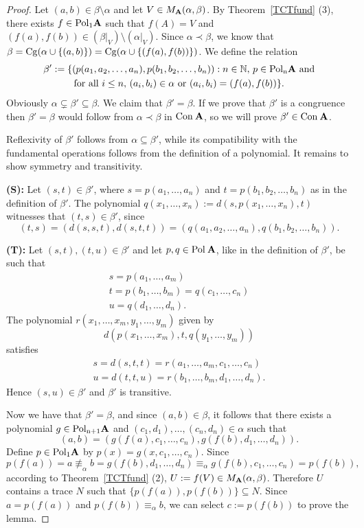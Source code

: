 \documentclass[11pt]{amsart}
\newcommand{\m}[1]{{\uppercase {\mathbf {#1}}}}
\newcommand{\pol}[1]{{\rm Pol\:\m #1}}
\newcommand{\poln}[2]{{\rm Pol_{#1}\m #2}}
\newcommand{\con}{{\rm Con\:}}
\newcommand{\cn}[1]{{\con\m {#1}}}
\newcommand{\Cg}{{\rm Cg}}
\theoremstyle{definition}
\begin{document}
\begin{proof}
Let $(a,b)\in\beta\setminus\alpha$ and let $V\in M_{\m a}(\alpha,\beta)$. By Theorem~\ref{TCTfund} (3), there exists $f\in\poln{1}{a}$ such that $f(A)=V$ and $(f(a),f(b))\in (\beta|_V)\setminus(\alpha|_V)$. Since $\alpha\prec\beta$, we know that $\beta=\Cg(\alpha\cup\{(a,b)\})=\Cg(\alpha\cup\{(f(a),f(b))\})$. We define the relation
\[
\begin{gathered}
\beta':=\{(p(a_1,a_2,\dots,a_n),p(b_1,b_2,\dots,b_n)):n\in\mathbb{N},\,p\in\poln{n}{a} \text{ and}\\
\text{for all }i\leq n,\,(a_i,b_i)\in\alpha\text{ or }(a_i,b_i)=(f(a),f(b))\}.
\end{gathered}
\]
Obviously $\alpha\subsetneq\beta'\subseteq\beta$. We claim that $\beta'=\beta$. If we prove that $\beta'$ is a congruence then $\beta'=\beta$ would follow from $\alpha\prec\beta$ in $\cn a$, so we will prove $\beta'\in\cn a$. 

Reflexivity of $\beta'$ follows from $\alpha\subseteq\beta'$, while its compatibility with the fundamental operations follows from the definition of a polynomial. It remains to show symmetry and transitivity.

{\bf (S):} Let $(s,t)\in\beta'$, where $s=p(a_1,\dots,a_n)$ and $t=p(b_1,b_2,\dots,b_n)$ as in the definition of $\beta'$. The polynomial $q(x_1,\dots,x_n):=d(s,p(x_1,\dots,x_n),t)$ witnesses that $(t,s)\in\beta'$, since
$$(t,s)=(d(s,s,t),d(s,t,t))=(q(a_1,a_2,\dots,a_n),q(b_1,b_2,\dots,b_n)).$$

{\bf (T):} Let $(s,t),(t,u)\in\beta'$ and let $p,q\in\pol{a}$, like in the definition of $\beta'$, be such that
\[
\begin{gathered}
s=p(a_1,\dots,a_m)\\
t=p(b_1,\dots,b_m)=q(c_1,\dots,c_n)\\
u=q(d_1,\dots,d_n).
\end{gathered}
\]
The polynomial $r(x_1,\dots,x_m,y_1,\dots,y_m)$ given by 
\[d(p(x_1,\dots,x_m),t,q(y_1,\dots,y_m))\]
satisfies
\[
\begin{gathered}
s= d(s,t,t) = r(a_1,\dots,a_m,c_1,\dots,c_n)\\
u= d(t,t,u) = r(b_1,\dots,b_m,d_1,\dots,d_n).
\end{gathered}
\]
Hence $(s,u)\in\beta'$ and $\beta'$ is transitive.

Now we have that $\beta'=\beta$, and since $(a,b)\in\beta$, it follows that there exists a polynomial $g\in\poln{n+1}{a}$ and $(c_1,d_1),\dots,(c_n,d_n)\in\alpha$ such that 
\[(a,b)=(g(f(a),c_1,\dots,c_n),g(f(b),d_1,\dots,d_n)).\]
Define $p\in\poln{1}{a}$ by $p(x)=g(x,c_1,\dots,c_n)$. Since 
$$p(f(a))=a\not\equiv_\alpha b=g(f(b),d_1,\dots,d_n)\equiv_\alpha g(f(b),c_1,\dots,c_n)= p(f(b)),$$
according to Theorem~\ref{TCTfund} (2), $U:=f(V)\in M_{\m a}(\alpha,\beta)$. Therefore $U$ contains a trace $N$ such that $\{p(f(a)),p(f(b))\}\subseteq N$. Since $a=p(f(a))$ and $p(f(b))\equiv_\alpha b$, we can select $c:=p(f(b))$ to prove the lemma.
\end{proof}
\end{document}

